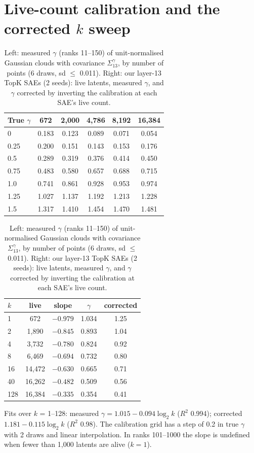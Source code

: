 \documentclass[10pt,twocolumn]{article}
\newcommand{\gam}{\gamma}
\begin{document}
\section{Live-count calibration and the corrected \texorpdfstring{$k$}{k} sweep}
\label{app:live}

\begin{table}[h]
\centering
\small
\caption{Left: measured $\gam$ (ranks 11--150) of unit-normalised Gaussian clouds with covariance $\Sigma_{13}^{\gam}$, by number of points (6 draws, sd $\le$ 0.011). Right: our layer-13 TopK SAEs (2 seeds): live latents, measured $\gam$, and $\gam$ corrected by inverting the calibration at each SAE's live count.}
\label{tab:live}
\begin{tabular}{lccccc}
\toprule
True $\gam$ & 672 & 2,000 & 4,786 & 8,192 & 16,384 \\
\midrule
0 & 0.183 & 0.123 & 0.089 & 0.071 & 0.054 \\
0.25 & 0.200 & 0.151 & 0.143 & 0.153 & 0.176 \\
0.5 & 0.289 & 0.319 & 0.376 & 0.414 & 0.450 \\
0.75 & 0.483 & 0.580 & 0.657 & 0.688 & 0.715 \\
1.0 & 0.741 & 0.861 & 0.928 & 0.953 & 0.974 \\
1.25 & 1.027 & 1.137 & 1.192 & 1.213 & 1.228 \\
1.5 & 1.317 & 1.410 & 1.454 & 1.470 & 1.481 \\
\bottomrule
\end{tabular}
\quad
\begin{tabular}{lcccc}
\toprule
$k$ & live & slope & $\gam$ & corrected \\
\midrule
1 & 672 & $-0.979$ & 1.034 & 1.25 \\
2 & 1,890 & $-0.845$ & 0.893 & 1.04 \\
4 & 3,732 & $-0.780$ & 0.824 & 0.92 \\
8 & 6,469 & $-0.694$ & 0.732 & 0.80 \\
16 & 14,472 & $-0.630$ & 0.665 & 0.71 \\
40 & 16,262 & $-0.482$ & 0.509 & 0.56 \\
128 & 16,384 & $-0.335$ & 0.354 & 0.41 \\
\bottomrule
\end{tabular}
\end{table}

Fits over $k$ = 1--128: measured $\gam = 1.015 - 0.094\log_2 k$ ($R^2$ 0.994); corrected $1.181 - 0.115\log_2 k$ ($R^2$ 0.98). The calibration grid has a step of 0.2 in true $\gam$ with 2 draws and linear interpolation. In ranks 101--1000 the slope is undefined when fewer than 1,000 latents are alive ($k = 1$).
\end{document}
